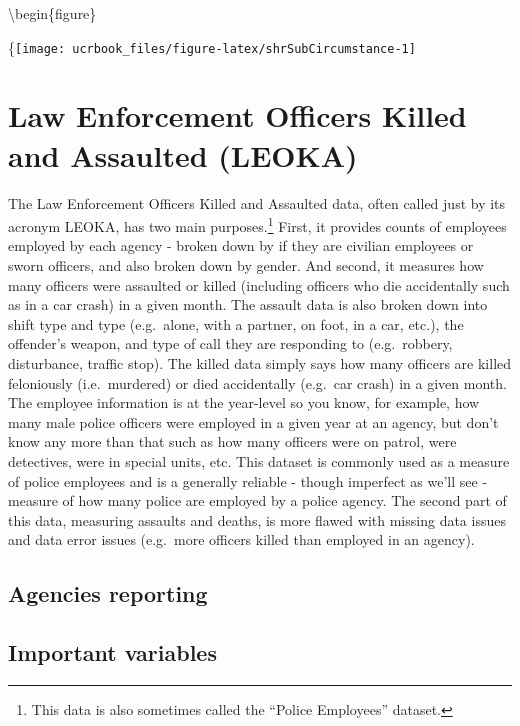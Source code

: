 \documentclass[
  12pt,
  openany]{book}
\begin{document}
\textbackslash begin\{figure\}

\{\centering \texttt{[image: ucrbook\_files/figure-latex/shrSubCircumstance-1]}

\hypertarget{leoka}{%
\chapter{Law Enforcement Officers Killed and Assaulted (LEOKA)}\label{leoka}}

The Law Enforcement Officers Killed and Assaulted data, often called just by its acronym LEOKA, has two main purposes.\footnote{This data is also sometimes called the ``Police Employees'' dataset.} First, it provides counts of employees employed by each agency - broken down by if they are civilian employees or sworn officers, and also broken down by gender. And second, it measures how many officers were assaulted or killed (including officers who die accidentally such as in a car crash) in a given month. The assault data is also broken down into shift type and type (e.g.~alone, with a partner, on foot, in a car, etc.), the offender's weapon, and type of call they are responding to (e.g.~robbery, disturbance, traffic stop). The killed data simply says how many officers are killed feloniously (i.e.~murdered) or died accidentally (e.g.~car crash) in a given month. The employee information is at the year-level so you know, for example, how many male police officers were employed in a given year at an agency, but don't know any more than that such as how many officers were on patrol, were detectives, were in special units, etc. This dataset is commonly used as a measure of police employees and is a generally reliable - though imperfect as we'll see - measure of how many police are employed by a police agency. The second part of this data, measuring assaults and deaths, is more flawed with missing data issues and data error issues (e.g.~more officers killed than employed in an agency).

\hypertarget{agencies-reporting-4}{%
\section{Agencies reporting}\label{agencies-reporting-4}}

\hypertarget{important-variables-4}{%
\section{Important variables}\label{important-variables-4}}
\end{document}
